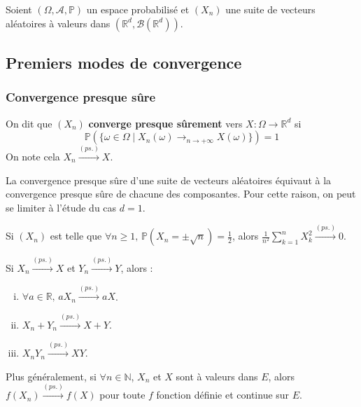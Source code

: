 




	Soient $(\Omega, \mathcal{A}, \mathbb{P})$ un espace probabilisé et $(X_n)$ une suite de vecteurs aléatoires à valeurs dans $(\mathbb{R}^d, \mathcal{B}(\mathbb{R}^d))$.

	\subsection{Premiers modes de convergence}

	\subsubsection{Convergence presque sûre}


	\begin{definition}
		On dit que $(X_n)$ \textbf{converge presque sûrement} vers $X : \Omega \rightarrow \mathbb{R}^d$ si
		\[ \mathbb{P}(\{ \omega \in \Omega \mid X_n(\omega) \longrightarrow_{n \rightarrow +\infty} X(\omega) \}) = 1 \]
		On note cela $X_n \overset{(ps.)}{\longrightarrow} X$.
	\end{definition}

	\begin{remark}
		La convergence presque sûre d'une suite de vecteurs aléatoires équivaut à la convergence presque sûre de chacune des composantes. Pour cette raison, on peut se limiter à l'étude du cas $d = 1$.
	\end{remark}


	\begin{example}
		Si $(X_n)$ est telle que $\forall n \geq 1, \, \mathbb{P}(X_n = \pm \sqrt{n}) = \frac{1}{2}$, alors $\frac{1}{n^2} \sum_{k=1}^n X_k^2 \overset{(ps.)}{\longrightarrow} 0$.
	\end{example}


	\begin{proposition}
		Si $X_n \overset{(ps.)}{\longrightarrow} X$ et $Y_n \overset{(ps.)}{\longrightarrow} Y$, alors :
		\begin{enumerate}[(i)]
			\item $\forall a \in \mathbb{R}, \, aX_n \overset{(ps.)}{\longrightarrow} aX$.
			\item $X_n + Y_n \overset{(ps.)}{\longrightarrow} X + Y$.
			\item $X_nY_n \overset{(ps.)}{\longrightarrow} XY$.
		\end{enumerate}
		Plus généralement, si $\forall n \in \mathbb{N}$, $X_n$ et $X$ sont à valeurs dans $E$, alors $f(X_n) \overset{(ps.)}{\longrightarrow} f(X)$ pour toute $f$ fonction définie et continue sur $E$.
	\end{proposition}

